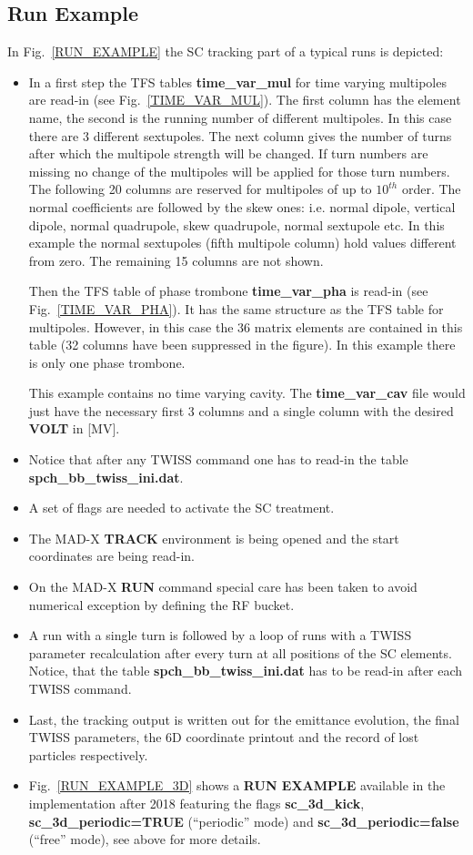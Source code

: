 \subsection{Run Example}

In Fig.~\ref{RUN_EXAMPLE} the SC tracking part of a typical runs is
depicted:
\begin{itemize}
\item In a first step the TFS tables {\bf time\_var\_mul} for time
  varying multipoles are read-in (see Fig.~\ref{TIME_VAR_MUL}). The
  first column has the element name, the second is the running number
  of different multipoles. In this case there are 3 different
  sextupoles. The next column gives the number of turns after which
  the multipole strength will be changed. If turn numbers are missing
  no change of the multipoles will be applied for those turn
  numbers. The following 20 columns are reserved for multipoles of up
  to $10^{th}$ order. The normal coefficients are followed by the skew
  ones: i.e. normal dipole, vertical dipole, normal quadrupole, skew
  quadrupole, normal sextupole etc. In this example the normal
  sextupoles (fifth multipole column) hold values different from
  zero. The remaining 15 columns are not shown.

  Then the TFS table of phase trombone {\bf time\_var\_pha} is read-in
  (see Fig.~\ref{TIME_VAR_PHA}). It has the same structure as the TFS
  table for multipoles. However, in this case the 36 matrix elements
  are contained in this table (32 columns have been suppressed in the
  figure). In this example there is only one phase trombone.

  This example contains no time varying cavity. The {\bf
    time\_var\_cav} file would just have the necessary first 3 columns
  and a single column with the desired {\bf VOLT} in [MV].
\item Notice that after any TWISS command one has to read-in the table
  {\bf  spch\_bb\_twiss\_ini.dat}.
\item A set of flags are needed to activate the SC treatment.
\item The MAD-X {\bf TRACK} environment is being opened and the start
  coordinates are being read-in.
\item On the MAD-X {\bf RUN} command special care has been taken to
  avoid numerical exception by defining the RF bucket.
\item A run with a single turn is followed by a loop of runs with a
  TWISS parameter recalculation after every turn at all positions of
  the SC elements. Notice, that the table {\bf
    spch\_bb\_twiss\_ini.dat} has to be read-in after each TWISS command.
\item Last, the tracking output is written out for the emittance
  evolution, the final TWISS parameters, the 6D coordinate printout
  and the record of lost particles respectively.
\item Fig.~\ref{RUN_EXAMPLE_3D} shows a {\bf RUN EXAMPLE} available
  in the implementation after 2018 featuring the flags {\bf
    sc\_3d\_kick}, {\bf sc\_3d\_periodic=TRUE} (``periodic'' mode) and
    {\bf sc\_3d\_periodic=false} (``free'' mode), see above for more
    details.

\end{itemize}


